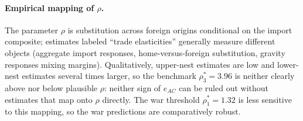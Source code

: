 \documentclass[11pt]{article}
\begin{document}
\paragraph{Empirical mapping of $\rho$.} The parameter $\rho$ is substitution across foreign origins conditional on the import composite; estimates labeled ``trade elasticities'' generally measure different objects (aggregate import responses, home-versus-foreign substitution, gravity responses mixing margins). Qualitatively, upper-nest estimates are low and lower-nest estimates several times larger, so the benchmark $\rho_3^* = 3.96$ is neither clearly above nor below plausible $\rho$: neither sign of $e_{AC}$ can be ruled out without estimates that map onto $\rho$ directly. The war threshold $\rho_1^* = 1.32$ is less sensitive to this mapping, so the war predictions are comparatively robust.
\end{document}
